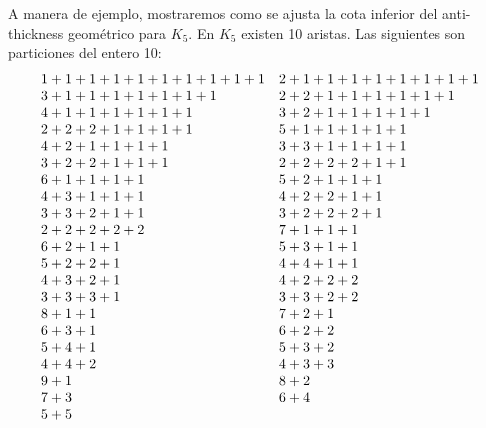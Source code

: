 A manera de ejemplo, mostraremos como se ajusta la cota inferior del anti-thickness
geométrico para $K_5$. En $K_5$ existen 10 aristas. Las siguientes son
particiones del entero 10:
\[
\begin{array}{l l}
  1 + 1 + 1 + 1 + 1 + 1 + 1 + 1 + 1 + 1 & 2 + 1 + 1 + 1 + 1 + 1 + 1 + 1 + 1\\
  3 + 1 + 1 + 1 + 1 + 1 + 1 + 1         & 2 + 2 + 1 + 1 + 1 + 1 + 1 + 1    \\
  4 + 1 + 1 + 1 + 1 + 1 + 1             & 3 + 2 + 1 + 1 + 1 + 1 + 1        \\
  2 + 2 + 2 + 1 + 1 + 1 + 1             & 5 + 1 + 1 + 1 + 1 + 1            \\
  4 + 2 + 1 + 1 + 1 + 1                 & 3 + 3 + 1 + 1 + 1 + 1            \\
  3 + 2 + 2 + 1 + 1 + 1                 & 2 + 2 + 2 + 2 + 1 + 1            \\
  6 + 1 + 1 + 1 + 1                     & 5 + 2 + 1 + 1 + 1                \\
  4 + 3 + 1 + 1 + 1                     & 4 + 2 + 2 + 1 + 1                \\
  3 + 3 + 2 + 1 + 1                     & 3 + 2 + 2 + 2 + 1                \\
  2 + 2 + 2 + 2 + 2                     & 7 + 1 + 1 + 1                    \\
  6 + 2 + 1 + 1                         & 5 + 3 + 1 + 1                    \\
  5 + 2 + 2 + 1                         & 4 + 4 + 1 + 1                    \\
  4 + 3 + 2 + 1                         & 4 + 2 + 2 + 2                    \\
  3 + 3 + 3 + 1                         & 3 + 3 + 2 + 2                    \\
  8 + 1 + 1                             & 7 + 2 + 1                        \\
  6 + 3 + 1                             & 6 + 2 + 2                        \\
  5 + 4 + 1                             & 5 + 3 + 2                        \\
  4 + 4 + 2                             & 4 + 3 + 3                        \\
  9 + 1                                 & 8 + 2                            \\
  7 + 3                                 & 6 + 4                            \\
  5 + 5
\end{array}
\]

